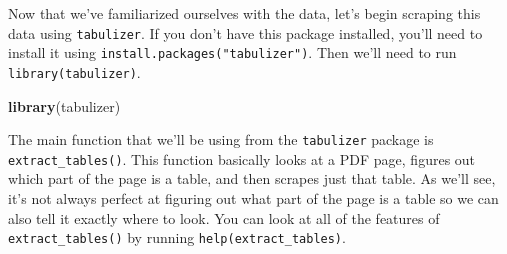 \documentclass[
  12pt,
]{book}
\newenvironment{Shaded}{\begin{snugshade}}{\end{snugshade}}
\newcommand{\KeywordTok}[1]{\textcolor[rgb]{0.27,0.27,0.27}{\textbf{#1}}}
\newcommand{\NormalTok}[1]{#1}
\begin{document}
Now that we've familiarized ourselves with the data, let's begin scraping this data using \texttt{tabulizer}. If you don't have this package installed, you'll need to install it using \texttt{install.packages("tabulizer")}. Then we'll need to run \texttt{library(tabulizer)}.

\begin{Shaded}
\begin{Highlighting}[]
\KeywordTok{library}\NormalTok{(tabulizer)}
\end{Highlighting}
\end{Shaded}

The main function that we'll be using from the \texttt{tabulizer} package is \texttt{extract\_tables()}. This function basically looks at a PDF page, figures out which part of the page is a table, and then scrapes just that table. As we'll see, it's not always perfect at figuring out what part of the page is a table so we can also tell it exactly where to look. You can look at all of the features of \texttt{extract\_tables()} by running \texttt{help(extract\_tables)}.
\end{document}
